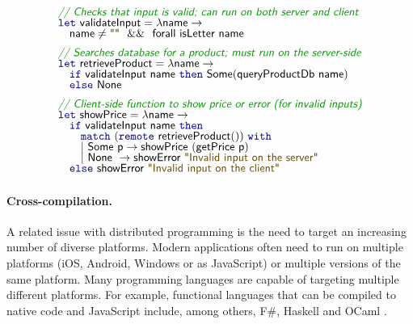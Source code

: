 
\begin{figure}
\begin{equation*}
\begin{array}{l}
\cmt{// Checks that input is valid; can run on both server and client}\\[-0.25em]
\kvd{let}~\ident{validateInput} = \lambda \ident{name} \rightarrow\\[-0.25em]
\quad\ident{name} \neq \str{} ~~\&\&~~ \ident{forall~isLetter~name}
\\[0.5em]
\cmt{// Searches database for a product; must run on the server-side}\\[-0.25em]
\kvd{let}~\ident{retrieveProduct} = \lambda \ident{name} \rightarrow\\[-0.25em]
\quad\kvd{if}~\ident{validateInput name}~\kvd{then}~\ident{Some}(\ident{queryProductDb~name})\\[-0.25em]
\quad\kvd{else}~\ident{None}
\\[0.5em]
\cmt{// Client-side function to show price or error (for invalid inputs)}\\[-0.25em]
\kvd{let}~\ident{showPrice} = \lambda \ident{name} \rightarrow\\[-0.25em]
\quad\kvd{if}~\ident{validateInput name}~\kvd{then}\\[-0.25em]
\quad\quad\kvd{match}~(\kvd{remote}~\ident{retrieveProduct}())~\kvd{with}\\[-0.25em]
\quad\quad|~\ident{Some}~\ident{p} \rightarrow \ident{showPrice}~(\ident{getPrice}~\ident{p})\\[-0.25em]
\quad\quad|~\ident{None}~\rightarrow \ident{showError}~\str{Invalid input on the server}\\[-0.25em]
\quad\kvd{else}~\ident{showError}~\str{Invalid input on the client}
\end{array}
\end{equation*}

\label{fig:applications-flat-distr}
\end{figure}


\paragraph{Cross-compilation.}
A related issue with distributed programming is the need to target an increasing number of diverse
platforms. Modern applications often need to run on multiple platforms (iOS, Android, Windows or
as JavaScript) or multiple versions of the same platform. Many programming languages are capable
of targeting multiple different platforms. For example, functional languages that can be compiled
to native code and JavaScript include, among others, F\#, Haskell and OCaml \cite{app-ocaml-js}.

